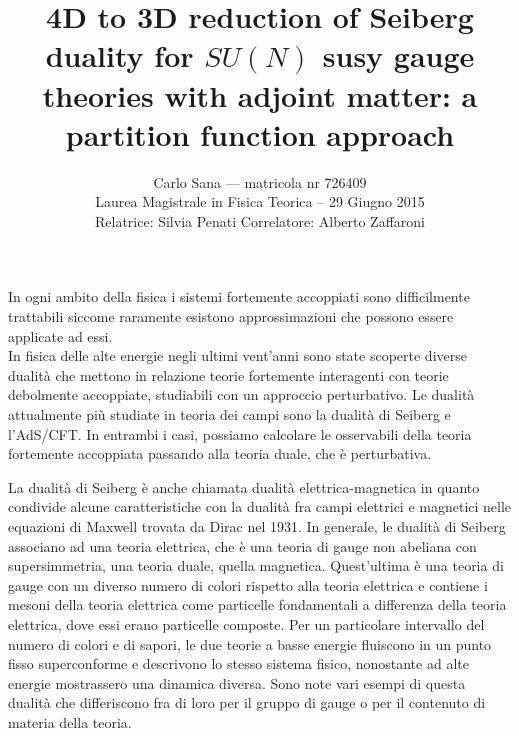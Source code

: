 \documentclass[a4paper,12pt]{article}
\author{
 Carlo Sana  --- matricola nr 726409 \\
 Laurea Magistrale in Fisica Teorica -- 29 Giugno 2015\\
Relatrice: Silvia Penati 
Correlatore: Alberto Zaffaroni\\
}
\date{}
\title{ \textbf{4D to 3D reduction of Seiberg duality for $SU(N)$ susy gauge theories with adjoint matter: a partition function approach }}
\begin{document}
\maketitle
In ogni ambito della fisica i sistemi fortemente accoppiati sono difficilmente trattabili siccome raramente esistono approssimazioni che possono essere applicate ad essi.\\
In fisica delle alte energie negli ultimi vent'anni sono state scoperte diverse dualità che mettono in relazione teorie fortemente interagenti con teorie debolmente accoppiate, studiabili con un approccio perturbativo.
Le dualità attualmente più studiate in teoria dei campi sono la dualità di Seiberg e l'AdS/CFT.
In entrambi i casi, possiamo calcolare le osservabili della teoria fortemente accoppiata passando alla teoria duale, che è perturbativa. 

La dualità di Seiberg è anche chiamata dualità elettrica-magnetica in quanto condivide alcune caratteristiche con la dualità fra campi elettrici e magnetici nelle equazioni di Maxwell trovata da Dirac nel 1931. 
In generale, le dualità di Seiberg associano ad una teoria elettrica, che è una teoria di gauge non abeliana con supersimmetria, una teoria duale, quella magnetica.
Quest'ultima è una teoria di gauge con un diverso numero di colori rispetto alla teoria elettrica e contiene i mesoni della teoria elettrica come particelle fondamentali a differenza della teoria elettrica, dove essi erano particelle composte.
Per un particolare intervallo del numero di colori e di sapori, le due teorie a basse energie fluiscono in un punto fisso superconforme e descrivono lo stesso sistema fisico, nonostante ad alte energie mostrassero una dinamica diversa.
Sono note vari esempi di questa dualità che differiscono fra di loro per il gruppo di gauge o per il contenuto di materia della teoria.
\end{document}
